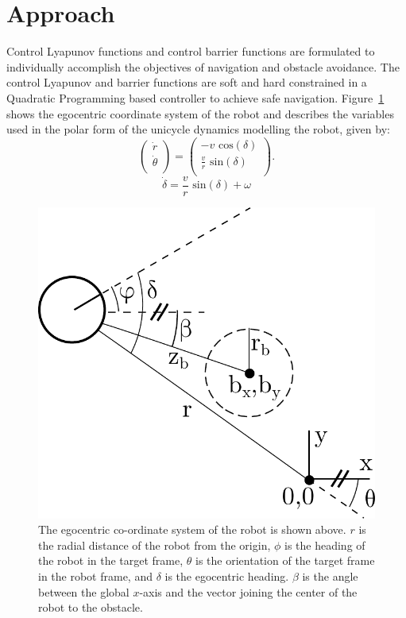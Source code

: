 \documentclass[conference]{IEEEtran}
\begin{document}
\section{Approach}
Control Lyapunov functions and control barrier functions are formulated to individually accomplish the objectives of navigation and obstacle avoidance. The control Lyapunov and barrier functions are soft and hard constrained in a Quadratic Programming based controller to achieve safe navigation. Figure~\ref{fig:obs} shows the egocentric coordinate system of the robot and describes the variables used in the polar form of the unicycle dynamics modelling the robot, given by: 
\begin{equation}
\left(
\begin{matrix}
\dot{r}\\
\dot{\theta}\\
\end{matrix}
\right)
=
\left(
\begin{matrix}
- v \text{ cos}(\delta)\\
\frac{v}{r} \text{ sin}(\delta)\\
\end{matrix}
\right).
\end{equation}
\begin{equation}
\dot{\delta}=\frac{v}{r} \text{ sin}(\delta)+\omega
\end{equation}
\begin{figure}[t]
\begin{center}
\includegraphics[scale=0.35]{obs.pdf} 
\caption{The egocentric co-ordinate system of the robot is shown above. $r$ is the radial distance of the robot from the origin, $\phi$ is the heading of the robot in the target frame, $\theta$ is the orientation of the target frame in the robot frame, and $\delta$ is  the egocentric heading. $\beta$ is the angle between the global $x$-axis and the vector joining the center of the robot to the obstacle. \label{fig:obs}} 
\end{center}
\end{figure}
\end{document}
